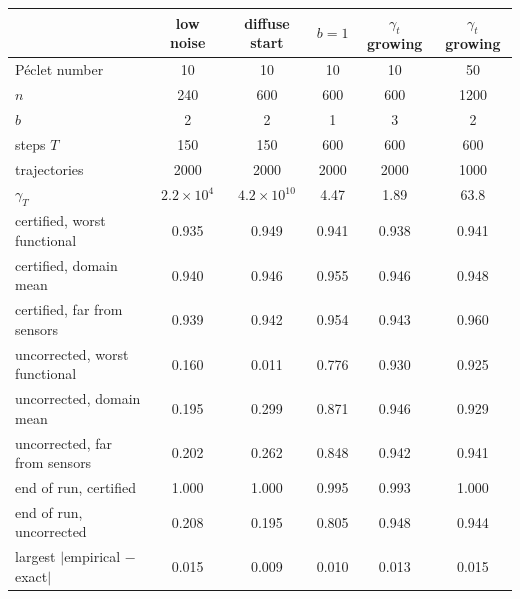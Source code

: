 \begin{tabular}{lccccc}
\toprule
 & low noise & diffuse start & $b=1$ & $\gamma_t$ growing & $\gamma_t$ growing \\
\midrule
P\'eclet number & 10 & 10 & 10 & 10 & 50 \\
$n$ & 240 & 600 & 600 & 600 & 1200 \\
$b$ & 2 & 2 & 1 & 3 & 2 \\
steps $T$ & 150 & 150 & 600 & 600 & 600 \\
trajectories & 2000 & 2000 & 2000 & 2000 & 1000 \\
$\gamma_T$ & $2.2{\times}10^{4}$ & $4.2{\times}10^{10}$ & 4.47 & 1.89 & 63.8 \\
\midrule
certified, worst functional & 0.935 & 0.949 & 0.941 & 0.938 & 0.941 \\
certified, domain mean & 0.940 & 0.946 & 0.955 & 0.946 & 0.948 \\
certified, far from sensors & 0.939 & 0.942 & 0.954 & 0.943 & 0.960 \\
uncorrected, worst functional & 0.160 & 0.011 & 0.776 & 0.930 & 0.925 \\
uncorrected, domain mean & 0.195 & 0.299 & 0.871 & 0.946 & 0.929 \\
uncorrected, far from sensors & 0.202 & 0.262 & 0.848 & 0.942 & 0.941 \\
\midrule
end of run, certified & 1.000 & 1.000 & 0.995 & 0.993 & 1.000 \\
end of run, uncorrected & 0.208 & 0.195 & 0.805 & 0.948 & 0.944 \\
largest $|$empirical $-$ exact$|$ & 0.015 & 0.009 & 0.010 & 0.013 & 0.015 \\
\bottomrule
\end{tabular}
